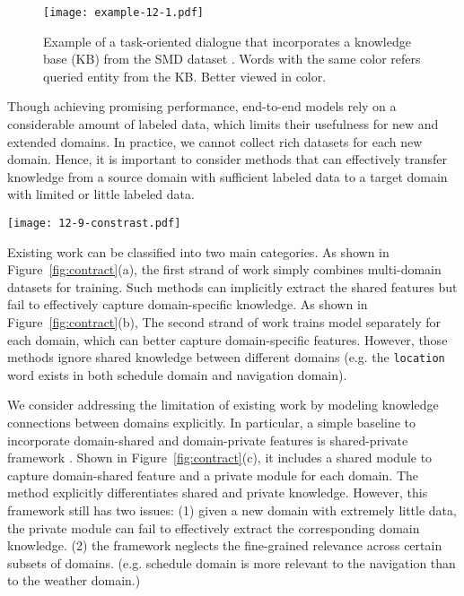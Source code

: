 \documentclass[11pt,a4paper]{article}
\begin{document}
\begin{figure}[t]
	\centering
	\texttt{[image: example-12-1.pdf]}
	\caption{
		Example of a task-oriented dialogue that incorporates a knowledge base (KB) from the SMD dataset \cite{eric-etal-2017-key}. 
		Words with the same color refers queried entity from the KB.
		Better viewed in color.
	}
	\label{fig:example}
\end{figure}
Though achieving promising performance, end-to-end models rely on a considerable amount of labeled data, which limits their usefulness for new and extended domains.
In practice, we cannot collect rich datasets for each new domain.
Hence, it is important to consider
methods that can effectively  transfer knowledge from a source domain with sufficient labeled data to a target domain with limited or little labeled data.
\begin{figure*}[t]
	\centering
	\texttt{[image: 12-9-constrast.pdf]}
	\caption{
		Methods for multi-domain dialogue.
		Previous work either trains a general  model on mixed multi-domain mixed datasets (a), or on each domain separately (b).
		The basic shared-private framework is shown (c).
		Our proposed extension with dynamic fusion mechanism is shown (d).
	}
	\label{fig:contract}
\end{figure*}

Existing work can be classified into two main categories.
As shown in Figure~\ref{fig:contract}(a), the first strand of work \cite{eric-manning-2017-copy,eric-etal-2017-key,madotto-etal-2018-mem2seq,DBLP:conf/iclr/WuSX19} simply combines multi-domain datasets for training.
Such methods can implicitly extract the shared features but fail to effectively capture domain-specific knowledge.
As shown in Figure~\ref{fig:contract}(b),
The second strand of work \cite{wen-etal-2018-sequence,qin-etal-2019-entity} trains model separately for each domain, which can better capture domain-specific features.
However, those methods ignore shared knowledge between different domains (e.g. the \texttt{location} word exists in both schedule domain and navigation domain).

We consider addressing the limitation of existing work by modeling knowledge connections between domains explicitly.
In particular, a simple baseline to incorporate domain-shared and domain-private features is shared-private framework \cite{liu-etal-2017-adversarial,zhong-etal-2018-global, DBLP:conf/nlpcc/WuZJXW19}. Shown in Figure~\ref{fig:contract}(c), it includes a shared module to capture domain-shared feature and a private module for each domain.
The method explicitly differentiates shared and private knowledge.
However, this framework still has two issues: (1) given a new domain with extremely little data, the private module can fail to effectively extract the corresponding domain knowledge.
(2) the framework neglects the fine-grained relevance across certain subsets of domains. (e.g. schedule domain is more relevant to the navigation than to the weather domain.)
\end{document}

